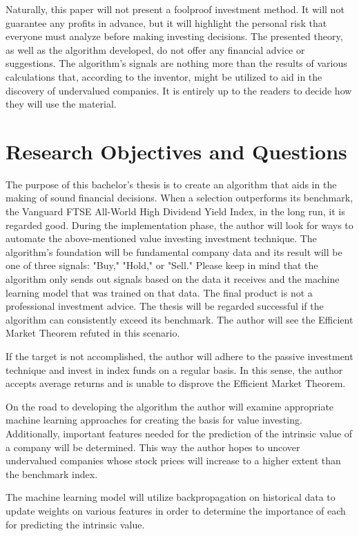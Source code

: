 \documentclass{imc-inf}
\begin{document}
Naturally, this paper will not present a foolproof investment method. It will not guarantee any profits in advance, but it will highlight the personal risk that everyone must analyze before making investing decisions. The presented theory, as well as the algorithm developed, do not offer any financial advice or suggestions. The algorithm's signals are nothing more than the results of various calculations that, according to the inventor, might be utilized to aid in the discovery of undervalued companies. It is entirely up to the readers to decide how they will use the material.

\section{Research Objectives and Questions}%
The purpose of this bachelor's thesis is to create an algorithm that aids in the making of sound financial decisions. When a selection outperforms its benchmark, the Vanguard FTSE All-World High Dividend Yield Index, in the long run, it is regarded good. During the implementation phase, the author will look for ways to automate the above-mentioned value investing investment technique. The algorithm's foundation will be fundamental company data and its result will be one of three signals: "Buy," "Hold," or "Sell." Please keep in mind that the algorithm only sends out signals based on the data it receives and the machine learning model that was trained on that data. The final product is not a professional investment advice.
The thesis will be regarded successful if the algorithm can consistently exceed its benchmark. The author will see the Efficient Market Theorem refuted in this scenario.

If the target is not accomplished, the author will adhere to the passive investment technique and invest in index funds on a regular basis. In this sense, the author accepts average returns and is unable to disprove the Efficient Market Theorem.

On the road to developing the algorithm the author will examine appropriate machine learning approaches for creating the basis for value investing. Additionally, important features needed for the prediction of the intrinsic value of a company will be determined. This way the author hopes to uncover undervalued companies whose stock prices will increase to a higher extent than the benchmark index.

The machine learning model will utilize backpropagation on historical data to update weights on various features in order to determine the importance of each for predicting the intrinsic value.
\end{document}

